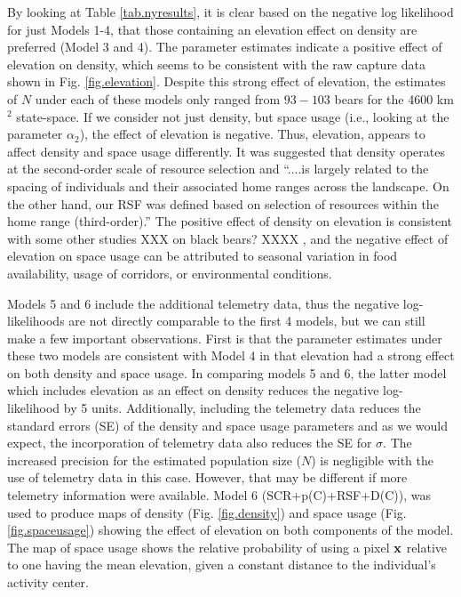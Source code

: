 By looking at Table \ref{tab.nyresults}, it is clear based on the
negative log likelihood for just Models 1-4, that those containing an
elevation effect on density are preferred (Model 3 and 4).  The
parameter estimates indicate a positive effect of elevation on
density, which seems to be consistent with the raw capture data shown
in Fig. \ref{fig.elevation}.  Despite this strong effect
of elevation, the estimates of $N$ under each of these models only
ranged from $93 - 103$ bears for the 4600 km$^2$ state-space.
  If we
consider not just density, but space usage (i.e., looking at the
parameter $\alpha_2$), the effect of elevation is negative.  Thus, elevation, appears to affect density and space usage
differently.  It was suggested that density operates at the
second-order scale of resource selection and ``....is largely related
to the spacing of individuals and their associated home ranges across
the landscape.  On the other hand, our RSF was defined based on
selection of resources within the home range (third-order).''
\citep{royle_etal:2012mee} 
The positive effect of density on elevation
is consistent with some other studies XXX on black bears? XXXX \citep[e.g.][]{frary_etal:2011},
and the negative effect of elevation on space usage can be attributed to
seasonal variation in food availability, usage of corridors, or
environmental conditions.


Models 5 and 6 include the additional telemetry data, thus the
negative log-likelihoods are not directly comparable to the first 4
models, but we can still make a few important observations.  First is
that the parameter estimates under these two models are consistent
with Model 4 in that elevation had a strong effect on both density and
space usage.  In comparing models 5 and 6, the latter model which
includes elevation as an effect on density reduces the negative
log-likelihood by 5 units.  Additionally, including the telemetry data
reduces the standard errors (SE) of the density and space usage
parameters and as we would expect, the incorporation of telemetry data
also reduces the SE for $\sigma$.  The increased precision for the
estimated population size ($N$) is negligible with the use of
telemetry data in this case.  However, that may be different if more
telemetry information were available.  Model 6 (SCR+p(C)+RSF+D(C)),
was used to produce maps of density (Fig. \ref{fig.density}) and space
usage (Fig. \ref{fig.spaceusage}) showing the effect of elevation on
both components of the model.  The map of space usage shows the
relative probability of using a pixel ${\bf x}$ relative to one having
the mean elevation, given a constant distance to the individual's
activity center.



